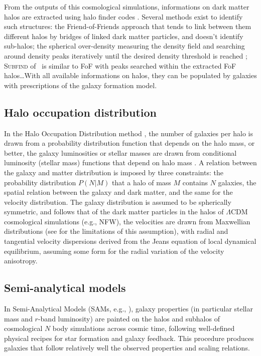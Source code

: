From the outputs of this cosmological simulations, informations on dark matter
halos are extracted using halo finder codes \citep{KK+09, Tweed+09,
Planelles+10}. Several methods exist to identify such structures: the
Friend-of-Friends approach \citep{Davis+85} that tends to link between them
different halos by bridges of linked dark matter particles, and doesn't
identify sub-halos; the spherical over-density measuring the density field and
searching around density peaks iteratively until the desired density threshold
is reached \citep{PS+74}; \textsc{Subfind} of~\cite{Springel+01} is similar to
FoF with peaks searched within the extracted FoF halos\ldots With all available
informations on halos, they can be populated by galaxies with prescriptions of
the galaxy formation model.

\subsection{Halo occupation distribution}
\label{sub:halo_occupation_distribution}

In the Halo Occupation Distribution method \citep{MS02,BW02,Zehavi+11}, the
number of galaxies per halo is drawn from a probability distribution function
that depends on the halo mass, or better, the galaxy luminosities or stellar
masses are drawn from conditional luminosity (stellar mass) functions that
depend on halo mass \citep{YMvdB03}. A relation between the galaxy and matter
distribution is imposed by three constraints: the probability distribution $P
\left(N|M\right)$ that a halo of mass $M$ contains $N$ galaxies, the spatial
relation between the galaxy and dark matter, and the same for the velocity
distribution. The galaxy distribution is assumed to be spherically symmetric,
and follows that of the dark matter particles in the halos of $\Lambda$CDM
cosmological simulations (e.g., NFW), the velocities are drawn from Maxwellian
distributions (see \citealp{Beraldo+14} for the limitations of this
assumption), with radial and tangential velocity dispersions derived from the
Jeans equation of local dynamical equilibrium, assuming some form for the
radial variation of the velocity anisotropy.

\subsection{Semi-analytical models}
\label{sub:semi_analytical_models}

In  Semi-Analytical Models (SAMs, e.g., \citealp{RQPR97,KCDW99}), galaxy
properties (in particular stellar mass and $r$-band luminosity) are painted on
the halos and subhalos of cosmological $N$ body simulations across cosmic time,
following well-defined physical recipes for star formation and galaxy feedback.
This procedure produces galaxies that follow relatively well the observed
properties and scaling relations.

